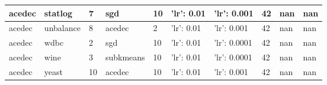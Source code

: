 \begin{table}[H]
\begin{tabular}{|l|l|l|l|l|l|l|l|l|l|}
\hline
acedec & statlog & 7 & sgd & 10 & {'lr': 0.01} & {'lr': 0.001} & 42 & nan & nan \\
\hline
acedec & unbalance & 8 & acedec & 2 & {'lr': 0.01} & {'lr': 0.001} & 42 & nan & nan \\
\hline
acedec & wdbc & 2 & sgd & 10 & {'lr': 0.01} & {'lr': 0.0001} & 42 & nan & nan \\
\hline
acedec & wine & 3 & subkmeans & 10 & {'lr': 0.01} & {'lr': 0.0001} & 42 & nan & nan \\
\hline
acedec & yeast & 10 & acedec & 10 & {'lr': 0.01} & {'lr': 0.001} & 42 & nan & nan \\
\hline
\end{tabular}
\end{table}